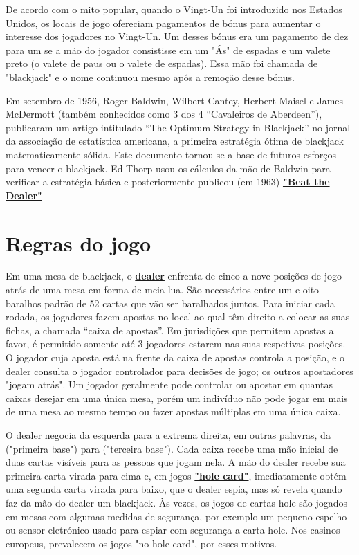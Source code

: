 \documentclass{report}
\begin{document}
De acordo com o mito popular, quando o Vingt-Un foi introduzido nos Estados Unidos, os locais de jogo ofereciam pagamentos de bónus para aumentar o interesse dos jogadores no Vingt-Un. Um desses bónus era um pagamento de dez para um se a mão do jogador consistisse em um "Ás" de espadas e um valete preto (o valete de paus ou o valete de espadas). Essa mão foi chamada de "blackjack" e o nome continuou mesmo após a remoção desse bónus.
 
Em setembro de 1956, Roger Baldwin, Wilbert Cantey, Herbert Maisel e James McDermott (também conhecidos como 3 dos 4 “Cavaleiros de Aberdeen”), publicaram um artigo intitulado “The Optimum Strategy in Blackjack” no jornal da associação de estatística americana, a primeira estratégia ótima de blackjack matematicamente sólida. Este documento tornou-se a base de futuros esforços para vencer o blackjack. Ed Thorp usou os cálculos da mão de Baldwin para verificar a estratégia básica e posteriormente publicou (em 1963) 
\hyperlink{Glossário}{\textbf{"Beat the Dealer"}}\cite{rules}


\chapter{Regras do jogo}
\label{chap.Regras do jogo}
Em uma mesa de blackjack, o \hyperlink{Glossário}{\textbf{dealer}} enfrenta de cinco a nove posições de jogo atrás de uma mesa em forma de meia-lua. São necessários entre um e oito baralhos padrão de 52 cartas que vão ser baralhados juntos. Para iniciar cada rodada, os jogadores fazem apostas no local ao qual têm direito a colocar as suas fichas, a chamada “caixa de apostas”. Em jurisdições que permitem apostas a favor, é permitido somente até 3 jogadores estarem nas suas respetivas posições. O jogador cuja aposta está na frente da caixa de apostas controla a posição, e o dealer consulta o jogador controlador para decisões de jogo; os outros apostadores "jogam atrás". Um jogador geralmente pode controlar ou apostar em quantas caixas desejar em uma única mesa, porém um indivíduo não pode jogar em mais de uma mesa ao mesmo tempo ou fazer apostas múltiplas em uma única caixa.
 
O dealer negocia da esquerda para a extrema direita, em outras palavras, da ("primeira base") para ("terceira base"). Cada caixa recebe uma mão inicial de duas cartas visíveis para as pessoas que jogam nela. A mão do dealer recebe sua primeira carta virada para cima e, em jogos \hyperlink{Glossário}{\textbf{"hole card"}}, imediatamente obtém uma segunda carta virada para baixo, que o dealer espia, mas só revela quando faz da mão do dealer um blackjack. Às vezes, os jogos de cartas hole são jogados em mesas com algumas medidas de segurança, por exemplo um pequeno espelho ou sensor eletrónico usado para espiar com segurança a carta hole. Nos casinos europeus, prevalecem os jogos "no hole card", por esses motivos.
 
\end{document}
